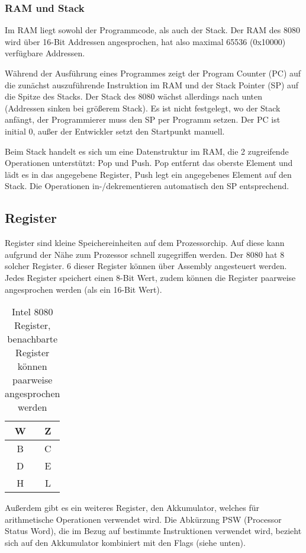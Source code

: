 \subsubsection{RAM und Stack}

Im \ac{RAM} liegt sowohl der Programmcode, als auch der Stack.
Der \ac{RAM} des 8080 wird über 16-Bit Addressen angesprochen, hat also maximal 65536 (0x10000) verfügbare Addressen.

Während der Ausführung eines Programmes zeigt der Program Counter (PC) auf die zunächst auszuführende Instruktion im \ac{RAM} und der Stack Pointer (SP) auf die Spitze des Stacks. Der Stack des 8080 wächst allerdings nach unten (Addressen sinken bei größerem Stack).
Es ist nicht festgelegt, wo der Stack anfängt, der Programmierer muss den SP per Programm setzen. Der PC ist initial 0, außer der Entwickler setzt den Startpunkt manuell.

Beim Stack handelt es sich um eine Datenstruktur im \ac{RAM}, die 2 zugreifende Operationen unterstützt: Pop und Push. Pop entfernt das oberste Element und lädt es in das angegebene Register, Push legt ein angegebenes Element auf den Stack. Die Operationen in-/dekrementieren automatisch den SP entsprechend.

\subsection{Register}

Register sind kleine Speichereinheiten auf dem Prozessorchip. Auf diese kann aufgrund der Nähe zum Prozessor schnell zugegriffen werden. Der 8080 hat 8 solcher Register.
6 dieser Register können über Assembly angesteuert werden. Jedes Register speichert einen 8-Bit Wert, zudem können die Register paarweise angesprochen werden (als ein 16-Bit Wert).

\begin{table}[h]
    \centering
    \caption{Intel 8080 Register, benachbarte Register können paarweise angesprochen werden}
    \label{tab:regs}
    \begin{tabular}{|c|c|}
        \hline
        W & Z \\\hline
        B & C \\\hline
        D & E \\\hline
        H & L \\\hline
    \end{tabular}
\end{table}

Außerdem gibt es ein weiteres Register, den Akkumulator, welches für arithmetische Operationen verwendet wird.
Die Abkürzung PSW (Processor Status Word), die im Bezug auf bestimmte Instruktionen verwendet wird, bezieht sich auf den Akkumulator kombiniert mit den Flags (siehe unten).

